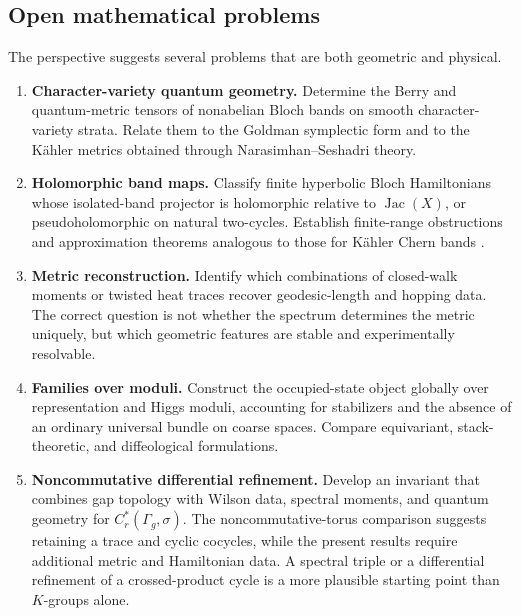 \documentclass[11pt]{article}
\theoremstyle{definition}
\theoremstyle{remark}
\newcommand{\Jac}{\operatorname{Jac}}
\begin{document}
\subsection{Open mathematical problems}

The perspective suggests several problems that are both geometric and
physical.

\begin{enumerate}[label=\arabic*.,leftmargin=2.0em]
\item \textbf{Character-variety quantum geometry.}
  Determine the Berry and quantum-metric tensors of nonabelian Bloch bands on
  smooth character-variety strata.  Relate them to the Goldman symplectic form
  and to the K\"ahler metrics obtained through
  Narasimhan--Seshadri theory.

\item \textbf{Holomorphic band maps.}
  Classify finite hyperbolic Bloch Hamiltonians whose isolated-band projector
  is holomorphic relative to \(\Jac(X)\), or pseudoholomorphic on natural
  two-cycles.  Establish finite-range obstructions and approximation
  theorems analogous to those for K\"ahler Chern bands
  \cite{MeraOzawaFlat}.

\item \textbf{Metric reconstruction.}
  Identify which combinations of closed-walk moments or twisted heat traces
  recover geodesic-length and hopping data.  The correct question is not
  whether the spectrum determines the metric uniquely, but which geometric
  features are stable and experimentally resolvable.

\item \textbf{Families over moduli.}
  Construct the occupied-state object globally over representation and Higgs
  moduli, accounting for stabilizers and the absence of an ordinary universal
  bundle on coarse spaces.  Compare equivariant, stack-theoretic, and
  diffeological formulations.

\item \textbf{Noncommutative differential refinement.}
  Develop an invariant that combines gap topology with Wilson data, spectral
  moments, and quantum geometry for \(C_r^*(\Gamma_g,\sigma)\).  The
  noncommutative-torus comparison suggests retaining a trace and cyclic
  cocycles, while the present results require additional metric and
  Hamiltonian data.  A spectral triple or a differential refinement of a
  crossed-product cycle is a more plausible starting point than \(K\)-groups
  alone.


\end{enumerate}
\end{document}
